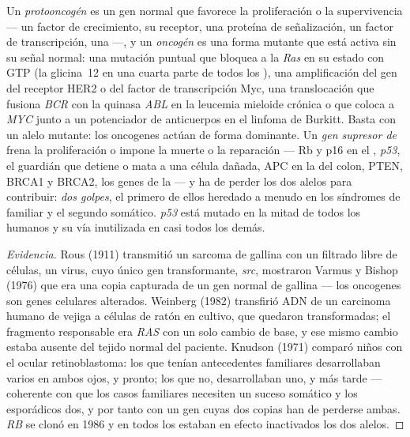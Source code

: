 \begin{definition}\label{def:b3:cancer-biology:genes}
Un \emph{protooncogén} es un gen normal que favorece la proliferación o
la supervivencia --- un factor de crecimiento, su receptor, una proteína
de señalización, un factor de transcripción, una  ---, y un
\emph{oncogén} es una forma mutante que está activa sin su señal normal:
una mutación puntual que bloquea a la  \emph{Ras} en su
estado con GTP (la glicina~12 en una cuarta parte de todos los ),
una amplificación del gen del receptor HER2 o del factor de
transcripción Myc, una translocación que fusiona \emph{BCR} con la
quinasa \emph{ABL} en la leucemia mieloide crónica o que coloca a
\emph{MYC} junto a un potenciador de anticuerpos en el linfoma de
Burkitt. Basta con un alelo mutante: los oncogenes actúan de forma
dominante. Un \emph{gen supresor de } frena la proliferación o
impone la muerte o la reparación --- Rb y p16 en el , \emph{p53}, el guardián que detiene o mata a una célula
dañada, APC en la  del colon, PTEN, BRCA1 y BRCA2, los genes de la
 --- y ha de perder los dos alelos
para contribuir: \emph{dos golpes}, el primero de ellos heredado a menudo
en los síndromes de  familiar y el segundo somático. \emph{p53}
está mutado en la mitad de todos los  humanos y su vía
inutilizada en casi todos los demás.
\end{definition}

\begin{proof}[Evidencia]
Rous (1911) transmitió un sarcoma de gallina con un filtrado libre de
células, un virus, cuyo único gen transformante, \emph{src}, mostraron
Varmus y Bishop (1976) que era una copia capturada de un gen normal de
gallina --- los oncogenes son genes celulares alterados. Weinberg (1982)
transfirió ADN de un carcinoma humano de vejiga a células de ratón en
cultivo, que quedaron transformadas; el fragmento responsable era
\emph{RAS} con un solo cambio de base, y ese mismo cambio estaba ausente
del tejido normal del paciente. Knudson (1971) comparó niños con el 
ocular retinoblastoma: los que tenían antecedentes familiares
desarrollaban varios  en ambos ojos, y pronto; los que no,
desarrollaban uno, y más tarde --- coherente con que los casos familiares
necesiten un suceso somático y los esporádicos dos, y por tanto con un
gen cuyas dos copias han de perderse ambas. \emph{RB} se clonó en 1986 y
en todos los  estaban en efecto inactivados los dos alelos.
\end{proof}

